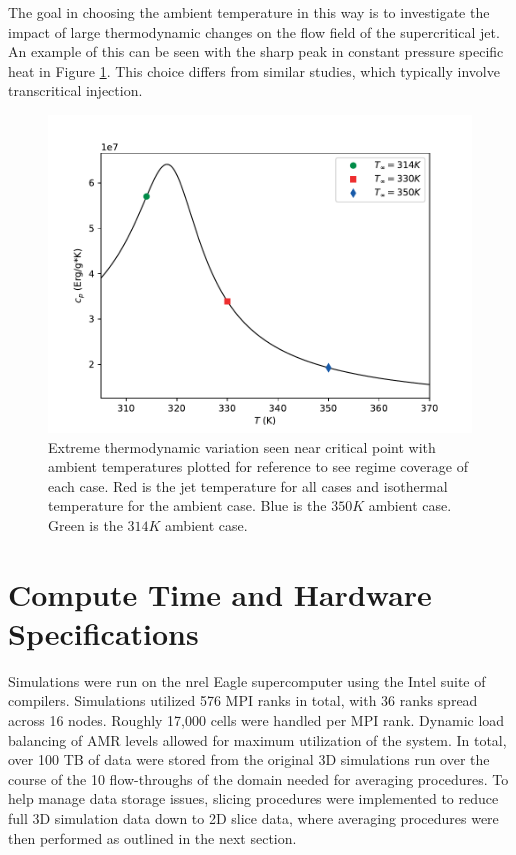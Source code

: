The goal in choosing the ambient temperature in this way is to investigate the impact of large thermodynamic changes on the flow field of the supercritical jet. An example of this can be seen with the sharp peak in constant pressure specific heat in Figure \ref{cp_vs_case}. This choice differs from similar studies, which typically involve transcritical injection. 

\begin{figure}[H]
\begin{center}
\includegraphics[scale=0.75]{figures/Plots/NIST/cp_cases.pdf}
\end{center}
\caption{Extreme thermodynamic variation seen near critical point with ambient temperatures plotted for reference to see regime coverage of each case. Red is the jet temperature for all cases and isothermal temperature for the ambient case. Blue is the $350 K$ ambient case. Green is the $314 K$ ambient case. }
\label{cp_vs_case}
\end{figure}

\section{Compute Time and Hardware Specifications}
Simulations were run on the \gls{nrel} Eagle supercomputer using the Intel suite of compilers. Simulations utilized 576 MPI ranks in total, with 36 ranks spread across 16 nodes. Roughly 17,000 cells were handled per MPI rank. Dynamic load balancing of AMR levels allowed for maximum utilization of the system. In total, over 100 TB of data were stored from the original 3D simulations run over the course of the 10 flow-throughs of the domain needed for averaging procedures. To help manage data storage issues, slicing procedures were implemented to reduce full 3D simulation data down to 2D slice data, where averaging procedures were then performed as outlined in the next section. 
